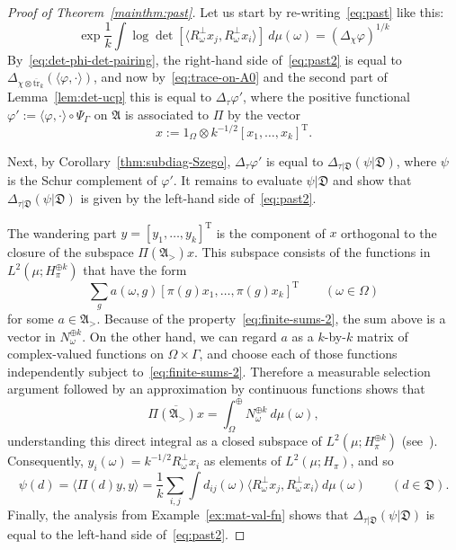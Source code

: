 \documentclass[12pt,a4paper]{article}
\numberwithin{equation}{section}
\theoremstyle{remark}
\renewcommand{\rm}[1]{\mathrm{#1}}
\newcommand{\A}{\mathfrak{A}}
\newcommand{\frD}{\mathfrak{D}}
\newcommand{\G}{\Gamma}
\renewcommand{\phi}{\varphi}
\newcommand{\ol}[1]{\overline{#1}}
\newcommand{\tr}{\overline{\mathrm{tr}}}
\begin{document}
\begin{proof}[Proof of Theorem~\ref{mainthm:past}]
Let us start by re-writing~\eqref{eq:past} like this:
\begin{equation}\label{eq:past2}
\exp\frac{1}{k}\int \log \det [\langle R_\omega^\perp x_j,R_\omega^\perp x_i\rangle]\ d\mu(\omega) = (\Delta_\chi \phi)^{1/k}
\end{equation}
By~\eqref{eq:det-phi-det-pairing}, the right-hand side of~\eqref{eq:past2} is equal to $\Delta_{\chi\otimes \tr_k}(\langle \phi,\cdot\rangle)$, and now by~\eqref{eq:trace-on-A0} and the second part of Lemma~\ref{lem:det-ucp} this is equal to $\Delta_\tau \phi'$, where the positive functional $\phi' := \langle \phi,\cdot \rangle\circ \Psi_\G$ on $\A$ is associated to $\Pi$ by the vector
\[x := 1_\Omega \otimes k^{-1/2}[x_1,\dots,x_k]^\rm{T}.\]

Next, by Corollary~\ref{thm:subdiag-Szego}, $\Delta_\tau \phi'$ is equal to $\Delta_{\tau|\frD}(\psi|\frD)$, where $\psi$ is the Schur complement of $\phi'$.  It remains to evaluate $\psi|\frD$ and show that $\Delta_{\tau|\frD}(\psi|\frD)$ is given by the left-hand side of~\eqref{eq:past2}.

The wandering part $y = [y_1,\dots,y_k]^\rm{T}$ is the component of $x$ orthogonal to the closure of the subspace $\Pi(\A_>)x$. This subspace consists of the functions in $L^2(\mu;H^{\oplus k}_\pi)$ that have the form
\[\sum_ga(\omega,g)[\pi(g)x_1,\dots,\pi(g)x_k]^\rm{T} \qquad (\omega \in \Omega)\]
for some $a \in \A_>$.  Because of the property~\eqref{eq:finite-sums-2}, the sum above is a vector in $N^{\oplus k}_\omega$.  On the other hand, we can regard $a$ as a $k$-by-$k$ matrix of complex-valued functions on $\Omega\times \G$, and choose each of those functions independently subject to~\eqref{eq:finite-sums-2}.   Therefore a measurable selection argument followed by an approximation by continuous functions shows that
\[\ol{\Pi(\A_>)x} = \int^\oplus_\Omega N_\omega^{\oplus k}\ d\mu(\omega),\]
understanding this direct integral as a closed subspace of $L^2(\mu;H_\pi^{\oplus k})$ (see~\cite[Chap. II.1]{Dix--vN}). Consequently, $y_i(\omega) = k^{-1/2}R_\omega^\perp x_i$ as elements of $L^2(\mu;H_\pi)$, and so
\[\psi(d) = \langle \Pi(d)y,y\rangle = \frac{1}{k}\sum_{i,j}\int d_{ij}(\omega)\langle R_\omega^\perp x_j,R_\omega^\perp x_i\rangle\ d\mu(\omega) \qquad (d \in \frD).\]
Finally, the analysis from Example~\ref{ex:mat-val-fn} shows that $\Delta_{\tau|\frD}(\psi|\frD)$ is equal to the left-hand side of~\eqref{eq:past2}.
\end{proof}
\end{document}
